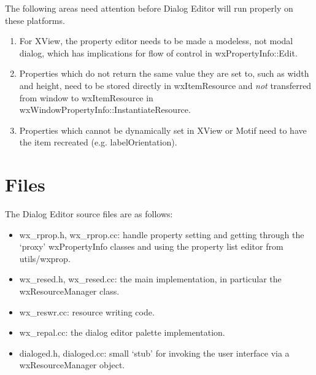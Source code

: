 The following areas need attention before Dialog Editor will run properly on these platforms.

\begin{enumerate}\itemsep=0pt
\item For XView, the property editor needs to be made a modeless, not modal dialog, which has
implications for flow of control in wxPropertyInfo::Edit.
\item Properties which do not return the same value they are set to, such as width and height,
need to be stored directly in wxItemResource and {\it not} transferred from window to wxItemResource
in wxWindowPropertyInfo::InstantiateResource.
\item Properties which cannot be dynamically set in XView or Motif need to have the item recreated (e.g. labelOrientation).
\end{enumerate}

\section{Files}

The Dialog Editor source files are as follows:

\begin{itemize}\itemsep=0pt
\item wx\_rprop.h, wx\_rprop.cc: handle property setting and getting through the `proxy' wxPropertyInfo
classes and using the property list editor from utils/wxprop.
\item wx\_resed.h, wx\_resed.cc: the main implementation, in particular the wxResourceManager class.
\item wx\_reswr.cc: resource writing code.
\item wx\_repal.cc: the dialog editor palette implementation.
\item dialoged.h, dialoged.cc: small `stub' for invoking the user interface via a wxResourceManager object.
\end{itemize}
